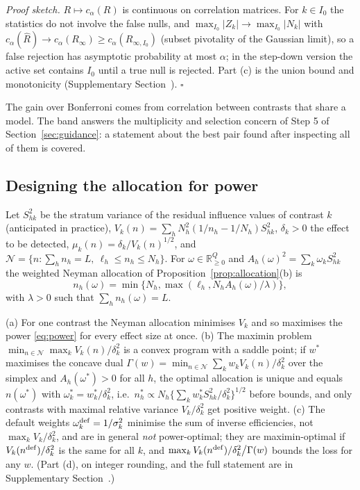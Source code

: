 \emph{Proof sketch.} $R\mapsto c_\alpha(R)$ is continuous on correlation matrices. For $k\in I_0$ the statistics do not involve the false nulls, and $\max_{I_0}|Z_k|\to\max_{I_0}|N_k|$ with $c_\alpha(\hat R)\to c_\alpha(R_\infty)\ge c_\alpha(R_{\infty,I_0})$ (subset pivotality of the Gaussian limit), so a false rejection has asymptotic probability at most $\alpha$; in the step-down version the active set contains $I_0$ until a true null is rejected. Part (c) is the union bound and monotonicity (Supplementary Section~). $\square$

The gain over Bonferroni comes from correlation between contrasts that share a model. The band answers the multiplicity and selection concern of Step 5 of Section~\ref{sec:guidance}: a statement about the best pair found after inspecting all of them is covered.

\subsection{Designing the allocation for power}\label{sec:test-design}

Let $S^2_{hk}$ be the stratum variance of the residual influence values of contrast $k$ (anticipated in practice), $V_k(n)=\sum_hN_h^2(1/n_h-1/N_h)S^2_{hk}$, $\delta_k>0$ the effect to be detected, $\mu_k(n)=\delta_k/V_k(n)^{1/2}$, and $\mathcal N=\{n:\sum_hn_h=L,\ \ell_h\le n_h\le N_h\}$. For $\omega\in\mathbb R^Q_{\ge0}$ and $A_h(\omega)^2=\sum_k\omega_kS^2_{hk}$ the weighted Neyman allocation of Proposition~\ref{prop:allocation}(b) is
\begin{equation}\label{eq:n-omega}
n_h(\omega)=\min\{N_h,\max(\ell_h,N_hA_h(\omega)/\lambda)\},
\end{equation}
with $\lambda>0$ such that $\sum_hn_h(\omega)=L$.

\begin{theorem}\label{thm:design}
(a) For one contrast the Neyman allocation minimises $V_k$ and so maximises the power \eqref{eq:power} for every effect size at once. (b) The maximin problem $\min_{n\in\mathcal N}\max_kV_k(n)/\delta_k^2$ is a convex program with a saddle point; if $w^\ast$ maximises the concave dual $\Gamma(w)=\min_{n\in\mathcal N}\sum_kw_kV_k(n)/\delta_k^2$ over the simplex and $A_h(\omega^\ast)>0$ for all $h$, the optimal allocation is unique and equals $n(\omega^\ast)$ with $\omega^\ast_k=w^\ast_k/\delta_k^2$, i.e.\ $n^\ast_h\propto N_h\{\sum_kw^\ast_kS^2_{hk}/\delta_k^2\}^{1/2}$ before bounds, and only contrasts with maximal relative variance $V_k/\delta_k^2$ get positive weight. (c) The default weights $\omega^{\rm def}_k=1/\sigma_k^2$ minimise the sum of inverse efficiencies, not $\max_kV_k/\delta_k^2$, and are in general \emph{not} power-optimal; they are maximin-optimal if $V_k(n^{\rm def})/\delta_k^2$ is the same for all $k$, and $\max_kV_k(n^{\rm def})/\delta_k^2\big/\Gamma(w)$ bounds the loss for any $w$. (Part (d), on integer rounding, and the full statement are in Supplementary Section~.)
\end{theorem}

